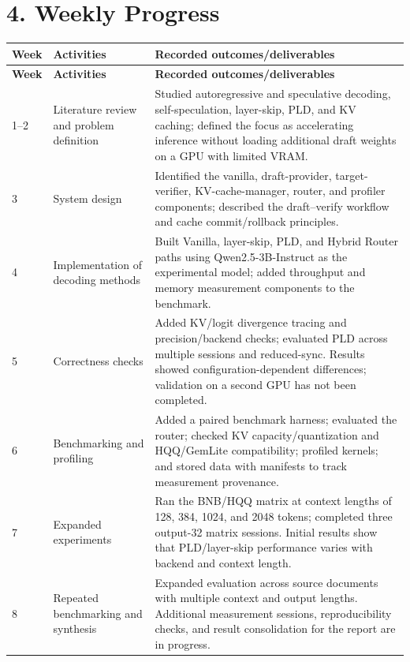 \section*{4. Weekly Progress}
\small
\begin{longtable}{p{1.6cm} p{3.6cm} p{8.5cm}}
\toprule
\textbf{Week} & \textbf{Activities} & \textbf{Recorded outcomes/deliverables} \\
\midrule
\endfirsthead
\toprule
\textbf{Week} & \textbf{Activities} & \textbf{Recorded outcomes/deliverables} \\
\midrule
\endhead
1--2 & Literature review and problem definition & Studied autoregressive and speculative decoding, self-speculation, layer-skip, PLD, and KV caching; defined the focus as accelerating inference without loading additional draft weights on a GPU with limited VRAM. \\
3 & System design & Identified the vanilla, draft-provider, target-verifier, KV-cache-manager, router, and profiler components; described the draft--verify workflow and cache commit/rollback principles. \\
4 & Implementation of decoding methods & Built Vanilla, layer-skip, PLD, and Hybrid Router paths using Qwen2.5-3B-Instruct as the experimental model; added throughput and memory measurement components to the benchmark. \\
5 & Correctness checks & Added KV/logit divergence tracing and precision/backend checks; evaluated PLD across multiple sessions and reduced-sync. Results showed configuration-dependent differences; validation on a second GPU has not been completed. \\
6 & Benchmarking and profiling & Added a paired benchmark harness; evaluated the router; checked KV capacity/quantization and HQQ/GemLite compatibility; profiled kernels; and stored data with manifests to track measurement provenance. \\
7 & Expanded experiments & Ran the BNB/HQQ matrix at context lengths of 128, 384, 1024, and 2048 tokens; completed three output-32 matrix sessions. Initial results show that PLD/layer-skip performance varies with backend and context length. \\
8 & Repeated benchmarking and synthesis & Expanded evaluation across source documents with multiple context and output lengths. Additional measurement sessions, reproducibility checks, and result consolidation for the report are in progress. \\
\bottomrule
\end{longtable}
\normalsize

